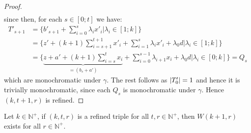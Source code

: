 \begin{proof}
\begin{align*}
	\end{align*}
	since then, for each $s \in [0; t]$ we have:
	\begin{align*}
		T'_{s + 1} & = \Bigg\{b'_{s + 1} + \sum_{i = 0}^{s} \lambda_i x'_i \Bigg| \lambda_i \in [1; k]\Bigg\}                                                                                             \\
		           & = \Bigg\{z' + (k + 1) \sum_{i = {s + 1}}^{t + 1} x'_i + \sum_{i = 1}^{s} \lambda_i x'_i + \lambda_0 d \Bigg| \lambda_i \in [1; k]\Bigg\}                                             \\
		           & = \Bigg\{\underset{=(b_s + a')}{\underbrace{z + a' + (k + 1) \sum_{i = s}^t x_i}} + \sum_{i = 0}^{s - 1} \lambda_{i + 1} x_i +\lambda_0 d \Bigg| \lambda_i \in [0; k] \Bigg\}  = Q_s
	\end{align*}
	which are monochromatic under $\gamma$. The rest follows as $\left\lvert T'_0\right\rvert = 1$ and hence it is trivially monochromatic, since each $Q_s$ is monochromatic under $\gamma$. Hence $(k, t + 1, r)$ is refined.
\end{proof}
\begin{lemma}\label{lem:2.36_rtoi}
	Let $k \in \mathbb{N}^+$, if $(k, t, r)$ is a refined triple for all $t, r \in \mathbb{N}^{+}$, then $W(k + 1, r)$ exists for all $r \in \mathbb{N}^{+}$.
\end{lemma}
